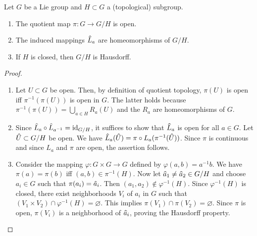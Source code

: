 \begin{lem}[{{\cite[Lem.~5.7.1]{RS1}}}]\label{lem 5.7.1 RS1}
    Let $G$ be a Lie group and $H\subset G$ a (topological) subgroup.
    \begin{enumerate}
        \item The quotient map $\pi:G\to G\slash H$ is open.
        \item The induced mappings $\wh{L}_a$ are homeomorphisms of $G\slash H$.
        \item If $H$ is closed, then $G\slash H$ is Hausdorff.
    \end{enumerate}
\end{lem}
\begin{proof}
    \begin{enumerate}
        \item Let $U\subset G$ be open. Then, by definition of quotient topology, $\pi(U)$ is open iff $\pi^{-1}(\pi(U))$ is open in $G$. The latter holds because $\pi^{-1}(\pi(U))=\bigcup_{a\in H}R_a(U)$ and the $R_a$ are homeomorphisms of $G$.
        \item Since $\wh{L}_a\circ \wh{L}_{a^{-1}}=\id_{G\slash H}$, it suffices to show that $\wh{L}_a$ is open for all $a\in G$. Let $\wh{U}\subset G\slash H$ be open. We have $\wh{L}_a(\wh{U})=\pi\circ L_a(\pi^{-1}(\wh{U}))$. Since $\pi$ is continuous and since $L_a$ and $\pi$ are open, the assertion follows.
        \item Consider the mapping $\varphi:G\times G\to G$  defined by $\varphi(a,b)=a^{-1}b$. We have $\pi(a)=\pi(b)$ iff $(a,b)\in\pi^{-1}(H)$. Now let $\wh{a}_1\neq \wh{a}_2\in G\slash H$ and choose $a_i\in G$ such that $\pi(a_i)=\wh{a}_i$. Then $(a_1,a_2)\notin \varphi^{-1}(H)$. Since $\varphi^{-1}(H)$ is closed, there exist neighborhoods $V_i$ of $a_i$ in $G$ such that $(V_1\times V_2)\cap \varphi^{-1}(H)=\varnothing$. This implies $\pi(V_1)\cap\pi(V_2)=\varnothing$. Since $\pi$ is open, $\pi(V_i)$ is a neighborhood of $\wh{a}_i$, proving the Hausdorff property.
    \end{enumerate}
\end{proof}


